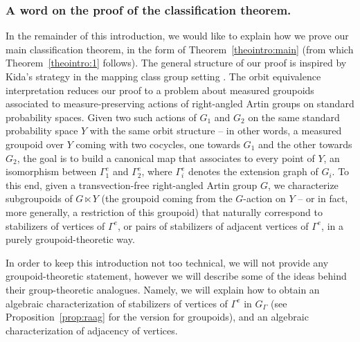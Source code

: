 \documentclass[JEP,XML,SOM,Unicode,NoFloatCountersInSection,published]{cedram}
\theoremstyle{plain}
\theoremstyle{definition}
\begin{document}
\subsubsection*{A word on the proof of the classification theorem.}
In the remainder of this introduction, we would like to explain how we prove our main classification theorem, in the form of Theorem~\ref{theointro:main} (from which Theorem~\ref{theointro:1} follows). The general structure of our proof is inspired by Kida's strategy in the mapping class group setting \cite{Kid}. The orbit equivalence interpretation reduces our proof to a problem about measured groupoids associated to measure-preserving actions of right-angled Artin groups on standard probability spaces. Given two such actions of $G_1$ and $G_2$ on the same standard probability space $Y$ with the same orbit structure -- in other words, a measured groupoid over $Y$ coming with two cocycles, one towards $G_1$ and the other towards $G_2$, the goal is to build a canonical map that associates to every point of $Y$, an isomorphism between $\Gamma^e_1$ and $\Gamma_2^e$, where $\Gamma^e_i$ denotes the extension graph of $G_i$. To this end, given a transvection-free right-angled Artin group $G$, we characterize subgroupoids of $G\ltimes Y$ (the groupoid coming from the $G$-action on $Y$ -- or in fact, more generally, a restriction of this groupoid) that naturally correspond to stabilizers of vertices of $\Gamma^e$, or pairs of stabilizers of adjacent vertices of $\Gamma^e$, in a purely groupoid-theoretic way.

In order to keep this introduction not too technical, we will not provide any groupoid-theoretic statement, however we will describe some of the ideas behind their group-theoretic analogues. Namely, we will explain how to obtain an algebraic characterization of stabilizers of vertices of $\Gamma^e$ in $G_\Gamma$ (see Proposition~\ref{prop:raag} for the version for groupoids), and an algebraic characterization of adjacency of vertices.
\end{document}
